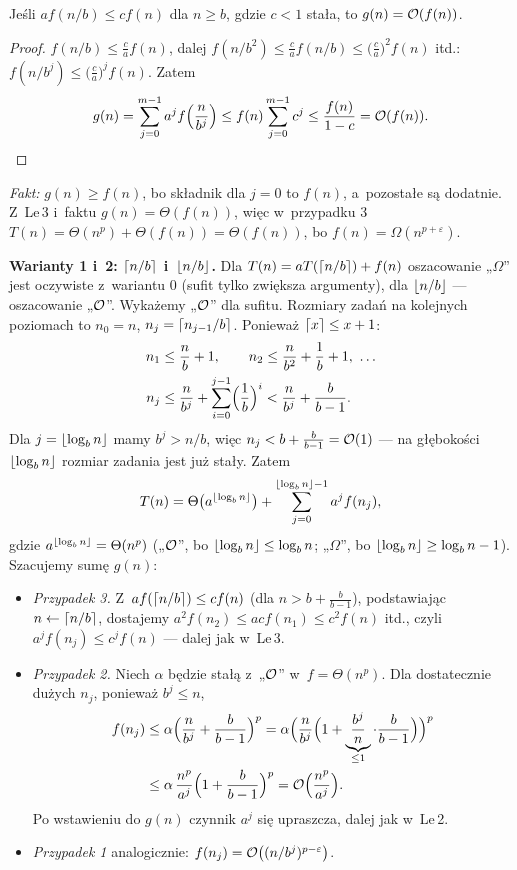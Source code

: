\documentclass[11pt]{article}
\begin{document}
\begin{lemat}[Le\,3]\label{lem:le3}
Jeśli $af(n/b)\le cf(n)$ dla $n\ge b$, gdzie $c<1$ stała, to $g(n)=\mathcal{O}(f(n))$.
\end{lemat}
\begin{proof}
$f(n/b)\le\frac caf(n)$, dalej
$f(n/b^2)\le\frac caf(n/b)\le\bigl(\frac ca\bigr)^2f(n)$ itd.:
$f(n/b^j)\le\bigl(\frac ca\bigr)^jf(n)$. Zatem
\[
g(n)=\sum_{j=0}^{m-1}a^jf\Bigl(\frac n{b^j}\Bigr)\le f(n)\sum_{j=0}^{m-1}c^j
\le\frac{f(n)}{1-c}=\mathcal{O}(f(n)).\qedhere
\]
\end{proof}
\emph{Fakt:} $g(n)\ge f(n)$, bo składnik dla $j=0$ to $f(n)$, a~pozostałe są
dodatnie. Z~Le\,3 i~faktu $g(n)=\Theta(f(n))$, więc w~przypadku 3
$T(n)=\Theta(n^p)+\Theta(f(n))=\Theta(f(n))$, bo $f(n)=\Omega(n^{p+\varepsilon})$.

\textbf{Warianty 1 i~2: $\left\lceil n/b \right\rceil$ i~$\left\lfloor n/b \right\rfloor$.} Dla
$T(n)=aT(\left\lceil n/b \right\rceil)+f(n)$ oszacowanie „$\Omega$” jest oczywiste
z~wariantu 0 (sufit tylko zwiększa argumenty), dla $\left\lfloor n/b \right\rfloor$ ---
oszacowanie „$\mathcal{O}$”. Wykażemy „$\mathcal{O}$” dla sufitu. Rozmiary zadań na kolejnych
poziomach to $n_0=n$, $n_j=\left\lceil n_{j-1}/b \right\rceil$. Ponieważ $\left\lceil x \right\rceil\le x+1$:
\begin{align*}
n_1&\le\frac nb+1,\qquad n_2\le\frac n{b^2}+\frac1b+1,\ \dots\\
n_j&\le\frac n{b^j}+\sum_{i=0}^{j-1}\Bigl(\frac1b\Bigr)^i<\frac n{b^j}+\frac b{b-1}.
\end{align*}
Dla $j=\left\lfloor \log_bn \right\rfloor$ mamy $b^j>n/b$, więc
$n_j<b+\frac b{b-1}=\mathcal{O}(1)$ --- na głębokości $\left\lfloor \log_bn \right\rfloor$ rozmiar
zadania jest już stały. Zatem
\[
T(n)=\Theta\bigl(a^{\left\lfloor \log_bn \right\rfloor}\bigr)+\sum_{j=0}^{\left\lfloor \log_bn \right\rfloor-1}a^jf(n_j),
\]
gdzie $a^{\left\lfloor \log_bn \right\rfloor}=\Theta(n^p)$ („$\mathcal{O}$”, bo $\left\lfloor \log_bn \right\rfloor\le\log_bn$;
„$\Omega$”, bo $\left\lfloor \log_bn \right\rfloor\ge\log_bn-1$). Szacujemy sumę $g(n)$:
\begin{itemize}
\item \emph{Przypadek 3.} Z~$af(\left\lceil n/b \right\rceil)\le cf(n)$ (dla
$n>b+\frac b{b-1}$), podstawiając $n\leftarrow\left\lceil n/b \right\rceil$, dostajemy
$a^2f(n_2)\le acf(n_1)\le c^2f(n)$ itd., czyli $a^jf(n_j)\le c^jf(n)$
--- dalej jak w~Le\,3.
\item \emph{Przypadek 2.} Niech $\alpha$ będzie stałą z~„$\mathcal{O}$” w~$f=\Theta(n^p)$.
Dla dostatecznie dużych $n_j$, ponieważ $b^j\le n$,
\begin{align*}
f(n_j)&\le\alpha\Bigl(\frac n{b^j}+\frac b{b-1}\Bigr)^p
=\alpha\Bigl(\frac n{b^j}\Bigl(1+\underbrace{\frac{b^j}n}_{\le1}\cdot\frac b{b-1}\Bigr)\Bigr)^p\\
&\le\alpha\,\frac{n^p}{a^j}\Bigl(1+\frac b{b-1}\Bigr)^p=\mathcal{O}\Bigl(\frac{n^p}{a^j}\Bigr).
\end{align*}
Po wstawieniu do $g(n)$ czynnik $a^j$ się upraszcza, dalej jak w~Le\,2.
\item \emph{Przypadek 1} analogicznie: $f(n_j)=\mathcal{O}\bigl((n/b^j)^{p-\varepsilon}\bigr)$.
\end{itemize}
\end{document}
